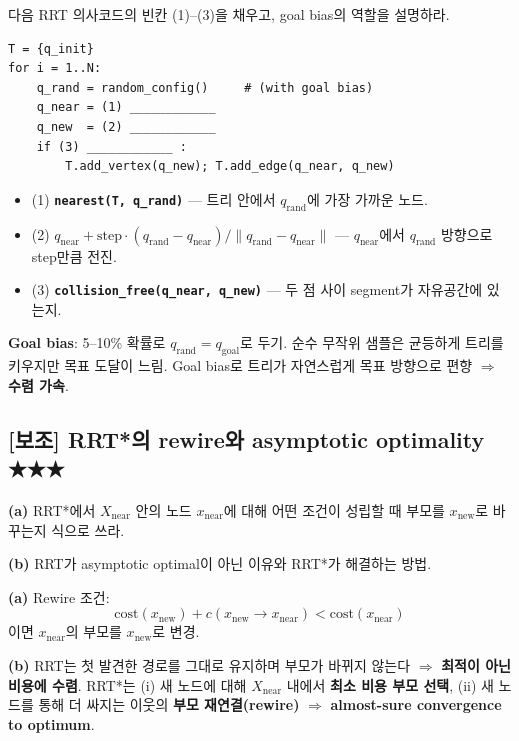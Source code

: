 \documentclass[11pt,a4paper]{article}
\begin{document}
\begin{prob}
다음 RRT 의사코드의 빈칸 (1)--(3)을 채우고, goal bias의 역할을 설명하라.
\begin{verbatim}
T = {q_init}
for i = 1..N:
    q_rand = random_config()     # (with goal bias)
    q_near = (1) ____________
    q_new  = (2) ____________
    if (3) ____________ :
        T.add_vertex(q_new); T.add_edge(q_near, q_new)
\end{verbatim}
\end{prob}

\begin{sol}
\begin{itemize}
  \item (1) \textbf{\texttt{nearest(T, q\_rand)}} --- 트리 안에서 $q_{\text{rand}}$에 가장 가까운 노드.
  \item (2) \textbf{$q_{\text{near}} + \text{step} \cdot (q_{\text{rand}} - q_{\text{near}}) / \|q_{\text{rand}} - q_{\text{near}}\|$} --- $q_{\text{near}}$에서 $q_{\text{rand}}$ 방향으로 step만큼 전진.
  \item (3) \textbf{\texttt{collision\_free(q\_near, q\_new)}} --- 두 점 사이 segment가 자유공간에 있는지.
\end{itemize}

\textbf{Goal bias}: 5--10\% 확률로 $q_{\text{rand}} = q_{\text{goal}}$로 두기. 순수 무작위 샘플은 균등하게 트리를 키우지만 목표 도달이 느림. Goal bias로 트리가 자연스럽게 목표 방향으로 편향 $\Rightarrow$ \textbf{수렴 가속}.
\end{sol}

\subsection*{[보조] RRT*의 rewire와 asymptotic optimality \hfill ★★★}

\begin{prob}
\textbf{(a)} RRT*에서 $X_{\text{near}}$ 안의 노드 $x_{\text{near}}$에 대해 어떤 조건이 성립할 때 부모를 $x_{\text{new}}$로 바꾸는지 식으로 쓰라.

\textbf{(b)} RRT가 asymptotic optimal이 아닌 이유와 RRT*가 해결하는 방법.
\end{prob}

\begin{sol}
\textbf{(a)} Rewire 조건:
\[
\mathrm{cost}(x_{\text{new}}) + c(x_{\text{new}} \to x_{\text{near}}) < \mathrm{cost}(x_{\text{near}})
\]
이면 $x_{\text{near}}$의 부모를 $x_{\text{new}}$로 변경.

\textbf{(b)} RRT는 첫 발견한 경로를 그대로 유지하며 부모가 바뀌지 않는다 $\Rightarrow$ \textbf{최적이 아닌 비용에 수렴}. RRT*는 (i) 새 노드에 대해 $X_{\text{near}}$ 내에서 \textbf{최소 비용 부모 선택}, (ii) 새 노드를 통해 더 싸지는 이웃의 \textbf{부모 재연결(rewire)} $\Rightarrow$ \textbf{almost-sure convergence to optimum}.
\end{sol}
\end{document}
